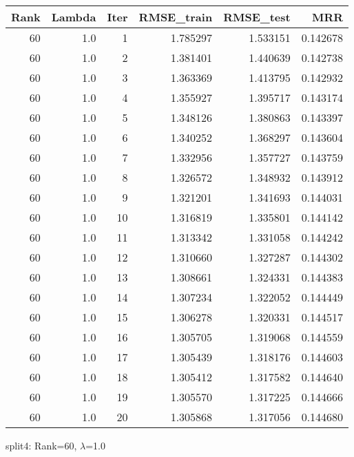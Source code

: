 \begin{tabular}{rrrrrr}
\toprule
 Rank &  Lambda &  Iter &  RMSE\_train &  RMSE\_test &       MRR \\
\midrule
   60 &     1.0 &     1 &    1.785297 &   1.533151 &  0.142678 \\
   60 &     1.0 &     2 &    1.381401 &   1.440639 &  0.142738 \\
   60 &     1.0 &     3 &    1.363369 &   1.413795 &  0.142932 \\
   60 &     1.0 &     4 &    1.355927 &   1.395717 &  0.143174 \\
   60 &     1.0 &     5 &    1.348126 &   1.380863 &  0.143397 \\
   60 &     1.0 &     6 &    1.340252 &   1.368297 &  0.143604 \\
   60 &     1.0 &     7 &    1.332956 &   1.357727 &  0.143759 \\
   60 &     1.0 &     8 &    1.326572 &   1.348932 &  0.143912 \\
   60 &     1.0 &     9 &    1.321201 &   1.341693 &  0.144031 \\
   60 &     1.0 &    10 &    1.316819 &   1.335801 &  0.144142 \\
   60 &     1.0 &    11 &    1.313342 &   1.331058 &  0.144242 \\
   60 &     1.0 &    12 &    1.310660 &   1.327287 &  0.144302 \\
   60 &     1.0 &    13 &    1.308661 &   1.324331 &  0.144383 \\
   60 &     1.0 &    14 &    1.307234 &   1.322052 &  0.144449 \\
   60 &     1.0 &    15 &    1.306278 &   1.320331 &  0.144517 \\
   60 &     1.0 &    16 &    1.305705 &   1.319068 &  0.144559 \\
   60 &     1.0 &    17 &    1.305439 &   1.318176 &  0.144603 \\
   60 &     1.0 &    18 &    1.305412 &   1.317582 &  0.144640 \\
   60 &     1.0 &    19 &    1.305570 &   1.317225 &  0.144666 \\
   60 &     1.0 &    20 &    1.305868 &   1.317056 &  0.144680 \\
\bottomrule
\end{tabular}

\caption{split4: Rank=60, $\lambda$=1.0}
